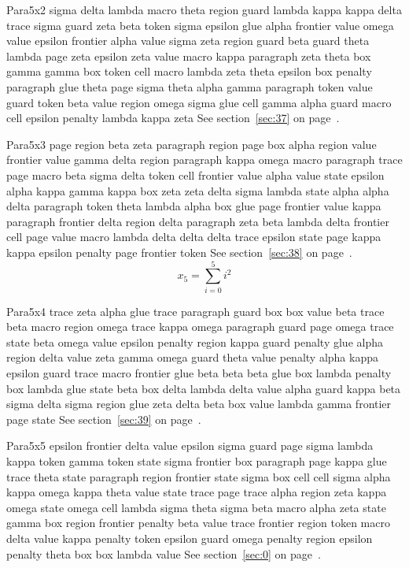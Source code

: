 \documentclass{article}
\begin{document}
Para5x2 sigma delta lambda macro theta region guard lambda kappa kappa delta trace sigma guard zeta beta token sigma epsilon glue alpha frontier value omega value epsilon frontier alpha value sigma zeta region guard beta guard theta lambda page zeta epsilon zeta value macro kappa paragraph zeta theta box gamma gamma box token cell macro lambda zeta theta epsilon box penalty paragraph glue theta page sigma theta alpha gamma paragraph token value guard token beta value region omega sigma glue cell gamma alpha guard macro cell epsilon penalty lambda kappa zeta See section~\ref{sec:37} on page~\pageref{sec:17}.

Para5x3 page region beta zeta paragraph region page box alpha region value frontier value gamma delta region paragraph kappa omega macro paragraph trace page macro beta sigma delta token cell frontier value alpha value state epsilon alpha kappa gamma kappa box zeta zeta delta sigma lambda state alpha alpha delta paragraph token theta lambda alpha box glue page frontier value kappa paragraph frontier delta region delta paragraph zeta beta lambda delta frontier cell page value macro lambda delta delta delta trace epsilon state page kappa kappa epsilon penalty page frontier token See section~\ref{sec:38} on page~\pageref{sec:18}.
\begin{equation} x_{5} = \sum_{i=0}^{5} i^2 \label{eq:5}\end{equation}

Para5x4 trace zeta alpha glue trace paragraph guard box box value beta trace beta macro region omega trace kappa omega paragraph guard page omega trace state beta omega value epsilon penalty region kappa guard penalty glue alpha region delta value zeta gamma omega guard theta value penalty alpha kappa epsilon guard trace macro frontier glue beta beta beta glue box lambda penalty box lambda glue state beta box delta lambda delta value alpha guard kappa beta sigma delta sigma region glue zeta delta beta box value lambda gamma frontier page state See section~\ref{sec:39} on page~\pageref{sec:19}.

Para5x5 epsilon frontier delta value epsilon sigma guard page sigma lambda kappa token gamma token state sigma frontier box paragraph page kappa glue trace theta state paragraph region frontier state sigma box cell cell sigma alpha kappa omega kappa theta value state trace page trace alpha region zeta kappa omega state omega cell lambda sigma theta sigma beta macro alpha zeta state gamma box region frontier penalty beta value trace frontier region token macro delta value kappa penalty token epsilon guard omega penalty region epsilon penalty theta box box lambda value See section~\ref{sec:0} on page~\pageref{sec:20}.
\end{document}
